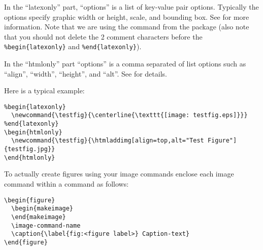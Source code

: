 \documentclass[11pt]{article}
\begin{document}


In the ``latexonly'' part, ``options'' is a list of key-value pair options.
Typically the options specify graphic width or height, scale, and bounding
box.  See  for more information.  Note
that we are using the  command from the
 package (also note that you should not delete the 2
comment characters before the \verb|%begin{latexonly}| and
\verb|%end{latexonly}|). 

In the ``htmlonly'' part ``options'' is a comma separated of list options
such as ``align'', ``width'', ``height'', and ``alt''.  See  for details.

Here is a typical example:
%
\begin{verbatim}
%begin{latexonly}
  \newcommand{\testfig}{\centerline{\texttt{[image: testfig.eps]}}}
%end{latexonly}
\begin{htmlonly}
  \newcommand{\testfig}{\htmladdimg[align=top,alt="Test Figure"]{testfig.jpg}}
\end{htmlonly}
\end{verbatim}



To actually create figures using your image commands enclose each image
command within a  command as follows:

\begin{verbatim}
\begin{figure}
  \begin{makeimage}
  \end{makeimage}
  \image-command-name
  \caption{\label{fig:<figure label>} Caption-text}
\end{figure}
\end{verbatim}
\end{document}
